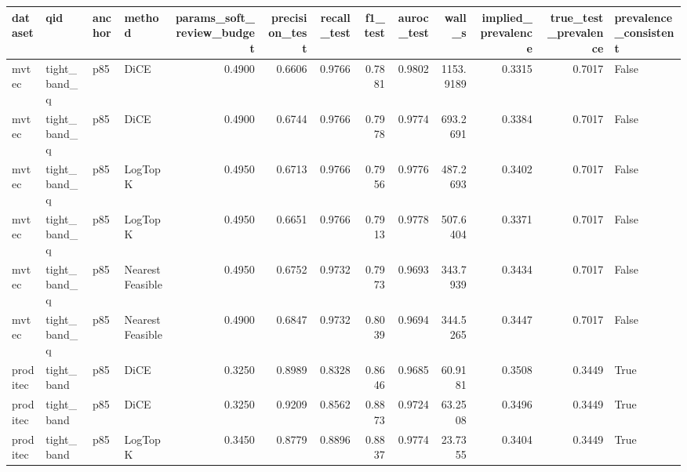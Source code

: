 \begin{tabular}{llllrrrrrrrrl}
\toprule
 dataset &          qid & anchor &          method &  params\_soft\_review\_budget &  precision\_test &  recall\_test &  f1\_test &  auroc\_test &    wall\_s &  implied\_prevalence &  true\_test\_prevalence &  prevalence\_consistent \\
\midrule
   mvtec & tight\_band\_q &    p85 &            DiCE &                     0.4900 &          0.6606 &       0.9766 &   0.7881 &      0.9802 & 1153.9189 &              0.3315 &                0.7017 &                  False \\
   mvtec & tight\_band\_q &    p85 &            DiCE &                     0.4900 &          0.6744 &       0.9766 &   0.7978 &      0.9774 &  693.2691 &              0.3384 &                0.7017 &                  False \\
   mvtec & tight\_band\_q &    p85 &         LogTopK &                     0.4950 &          0.6713 &       0.9766 &   0.7956 &      0.9776 &  487.2693 &              0.3402 &                0.7017 &                  False \\
   mvtec & tight\_band\_q &    p85 &         LogTopK &                     0.4950 &          0.6651 &       0.9766 &   0.7913 &      0.9778 &  507.6404 &              0.3371 &                0.7017 &                  False \\
   mvtec & tight\_band\_q &    p85 & NearestFeasible &                     0.4950 &          0.6752 &       0.9732 &   0.7973 &      0.9693 &  343.7939 &              0.3434 &                0.7017 &                  False \\
   mvtec & tight\_band\_q &    p85 & NearestFeasible &                     0.4900 &          0.6847 &       0.9732 &   0.8039 &      0.9694 &  344.5265 &              0.3447 &                0.7017 &                  False \\
proditec &   tight\_band &    p85 &            DiCE &                     0.3250 &          0.8989 &       0.8328 &   0.8646 &      0.9685 &   60.9181 &              0.3508 &                0.3449 &                   True \\
proditec &   tight\_band &    p85 &            DiCE &                     0.3250 &          0.9209 &       0.8562 &   0.8873 &      0.9724 &   63.2508 &              0.3496 &                0.3449 &                   True \\
proditec &   tight\_band &    p85 &         LogTopK &                     0.3450 &          0.8779 &       0.8896 &   0.8837 &      0.9774 &   23.7355 &              0.3404 &                0.3449 &                   True \\

\end{tabular}

